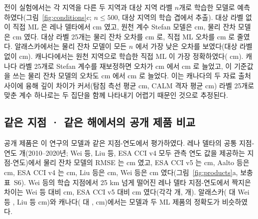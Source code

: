 전이 실험에서는 각 지역을 다른 두 지역과 대상 지역 라벨 $n$개로 학습한 모델로 예측하였다(그림~\ref{fig:conditions}c; $n \leq 500$, 대상 지역의 학습 겹에서 추출). 대상 라벨 없이 직접 ML 은 레나 델타에서 \ntlrmseLeDszero{} cm 였고, 원천 계수 Stefan 모델은 \ntlrmseLePzzero{} cm, 물리 잔차 모델은 \ntlrmseLeRszero{} cm 였다. 대상 라벨 25개는 물리 잔차 오차를 \ntlrmseLeRstwfive{} cm 로, 직접 ML 오차를 \ntlrmseLeDstwfive{} cm 로 줄였다. 알래스카에서는 물리 잔차 모델이 모든 $n$ 에서 가장 낮은 오차를 보였다(대상 라벨 없이 \ntlrmseAkRszero{} cm). 캐나다에서는 원천 지역으로 학습한 직접 ML 이 가장 정확하였다(\ntlrmseCaDszero{} cm). 캐나다 라벨 25개로 Stefan 계수를 재보정하면 오차가 \ntlrmseCaPzzero{} cm 에서 \ntlrmseCaPntwfive{} cm 로 늘었고, 이 기준값을 쓰는 물리 잔차 모델의 오차도 \ntlrmseCaRszero{} cm 에서 \ntlrmseCaRstwfive{} cm 로 늘었다. 이는 캐나다의 두 자료 출처 사이에 융해 깊이 차이가 커서(탐침 측선 평균 \nsrcCaABoVEObs{} cm, CALM 격자 평균 \nsrcCaCALMObs{} cm) 라벨 25개로 맞춘 계수 하나로는 두 집단을 함께 나타내기 어렵기 때문인 것으로 추정된다.

\subsection{같은 지점 · 같은 해에서의 공개 제품 비교}
공개 제품은 이 연구의 모델과 같은 지점-연도에서 평가하였다. 레나 델타의 공통 지점-연도 \nccLeN{}개(2010--2020년; Wei 등, Liu 등, ESA CCI v4 모두 관측 연도 값을 제공하는 지점-연도)에서 물리 잔차 모델의 RMSE 는 \nccLeRoall{} cm 였고, ESA CCI v5 는 \nccLeCcifiveall{} cm, Aalto 등은 \nccLeAaltoall{} cm, ESA CCI v4 는 \nccLeCcifourall{} cm, Liu 등은 \nccLeLiuall{} cm, Wei 등은 \nccLeWeiall{} cm 였다(그림~\ref{fig:products}a, 보충 표~S6). Wei 등의 학습 지점에서 25 km 넘게 떨어진 레나 델타 지점-연도에서 짝지은 차이는 Wei 등 대비 \ndprodLeweiRomask{} cm, ESA CCI v5 대비 \ndprodLeccifiveRomask{} cm 였다(각각 \nnprodLeweimask{}개, \nnprodLeccifivemask{}개). 알래스카(\nccAkRoall{} 대 Wei 등 \nccAkWeiall, Liu 등 \nccAkLiuall{} cm)와 캐나다(\nccCaRoall{} 대 \nccCaWeiall, \nccCaLiuall{} cm)에서는 모델과 두 ML 제품의 정확도가 비슷하였다.

